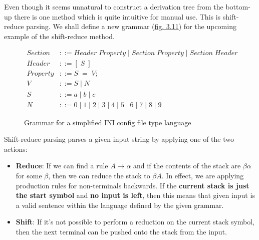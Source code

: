 
Even though it seems unnatural to construct a derivation tree from the bottom-up there is one method which is quite intuitive for manual use. This is shift-reduce parsing. We shall define a new grammar (\hyperref[fig:3.11]{fig. 3.11}) for the upcoming example of the shift-reduce method.

\begin{figure}[h]
    \begin{center}
        \begin{equation}
            \begin{split}
                Section &::= Header\;Property\;|\;Section\;Property\;|\;Section\;Header\\
                Header &::= [\;S\;]\\
                Property &::= S\;=\;V;\\
                V &::= S\;|\;N\\
                S &::= a\;|\;b\;|\;c\\
                N &::= 0\;|\;1\;|\;2\;|\;3\;|\;4\;|\;5\;|\;6\;|\;7\;|\;8\;|\;9
            \end{split}
            \nonumber
        \end{equation}
    \end{center}
    \vspace{-1em}
    \caption{\label{fig:3.11}Grammar for a simplified INI config file type language}
\end{figure}

\pagebreak

Shift-reduce parsing parses a given input string by applying one of the two actions:

\begin{itemize}
    \item \textbf{Reduce}: If we can find a rule $A \rightarrow \alpha$ and if the contents of the stack are $\beta\alpha$ for some $\beta$, then we can reduce the stack to $\beta A$. In effect, we are applying production rules for non-terminals backwards. If the \textbf{current stack is just the start symbol} and \textbf{no input is left}, then this means that given input is a valid sentence within the language defined by the given grammar.
    \item \textbf{Shift}: If it's not possible to perform a reduction on the current stack symbol, then the next terminal can be pushed onto the stack from the input.
\end{itemize}

